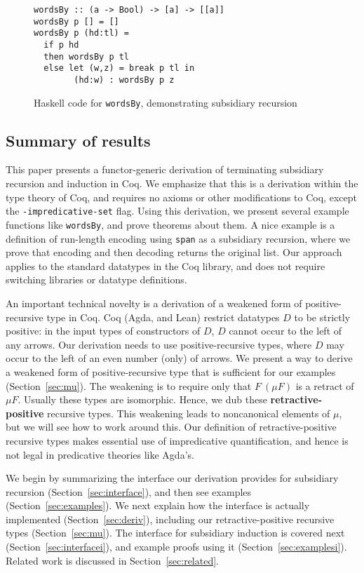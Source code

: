 \documentclass[a4paper,USenglish]{lipics-v2021}
\begin{document}
\begin{figure}
\begin{verbatim}
wordsBy :: (a -> Bool) -> [a] -> [[a]]
wordsBy p [] = []
wordsBy p (hd:tl) =
  if p hd
  then wordsBy p tl 
  else let (w,z) = break p tl in
        (hd:w) : wordsBy p z
\end{verbatim}
\caption{Haskell code for \texttt{wordsBy}, demonstrating subsidiary recursion}
\label{fig:wordsBy}
\end{figure}

\subsection{Summary of results}

This paper presents a functor-generic derivation of terminating
subsidiary recursion and induction in Coq.  We emphasize that this is
a derivation within the type theory of Coq, and requires no axioms or
other modifications to Coq, except the \verb|-impredicative-set|
flag. Using this derivation, we present several example functions like
\verb|wordsBy|, and prove theorems about them.  A nice example is a
definition of run-length encoding using \verb|span| as a subsidiary
recursion, where we prove that encoding and then decoding returns the
original list.  Our approach applies to the standard datatypes in the
Coq library, and does not require switching libraries or datatype
definitions.

An important technical novelty is a derivation of a weakened form of
positive-recursive type in Coq.  Coq (Agda, and Lean) restrict
datatypes $D$ to be strictly positive: in the input types of
constructors of $D$, $D$ cannot occur to the left of any arrows.  Our
derivation needs to use positive-recursive types, where $D$ may occur
to the left of an even number (only) of arrows.  We present a way to
derive a weakened form of positive-recursive type that is sufficient
for our examples (Section~\ref{sec:mu}).  The weakening is to require
only that $F\ (\mu F)$ is a retract of $\mu F$.  Usually these types are
isomorphic.  Hence, we dub these \textbf{retractive-positive}
recursive types.  This weakening leads to noncanonical elements of
$\mu$, but we will see how to work around this.  Our definition of
retractive-positive recursive types makes essential use of
impredicative quantification, and hence is not legal in predicative
theories like Agda's.

We begin by summarizing the interface our derivation provides for
subsidiary recursion (Section~\ref{sec:interface}), and then see
examples (Section~\ref{sec:examples}).  We next explain how the
interface is actually implemented (Section~\ref{sec:deriv}), including
our retractive-positive recursive types (Section~\ref{sec:mu}).  The
interface for subsidiary induction is covered next
(Section~\ref{sec:interfacei}), and example proofs using it
(Section~\ref{sec:examplesi}).  Related work is discussed in
Section~\ref{sec:related}.
\end{document}
